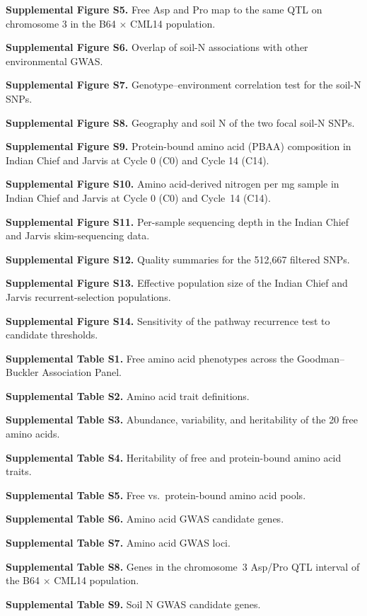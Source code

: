 \documentclass[namedate,unnumsec,webpdf,contemporary,large]{oup-authoring-template}
\begin{document}
\textbf{Supplemental Figure S5.} Free Asp and Pro map to the same QTL on chromosome 3 in the B64 $\times$ CML14 population.

\textbf{Supplemental Figure S6.} Overlap of soil-N associations with other environmental GWAS.

\textbf{Supplemental Figure S7.} Genotype--environment correlation test for the soil-N SNPs.

\textbf{Supplemental Figure S8.} Geography and soil N of the two focal soil-N SNPs.

\textbf{Supplemental Figure S9.} Protein-bound amino acid (PBAA) composition in Indian Chief and Jarvis at Cycle 0 (C0) and Cycle 14 (C14).

\textbf{Supplemental Figure S10.} Amino acid-derived nitrogen per mg sample in Indian Chief and Jarvis at Cycle 0 (C0) and Cycle~14 (C14).

\textbf{Supplemental Figure S11.} Per-sample sequencing depth in the Indian Chief and Jarvis skim-sequencing data.

\textbf{Supplemental Figure S12.} Quality summaries for the 512,667 filtered SNPs.

\textbf{Supplemental Figure S13.} Effective population size of the Indian Chief and Jarvis recurrent-selection populations.

\textbf{Supplemental Figure S14.} Sensitivity of the pathway recurrence test to candidate thresholds.

\textbf{Supplemental Table S1.} Free amino acid phenotypes across the Goodman--Buckler Association Panel.

\textbf{Supplemental Table S2.} Amino acid trait definitions.

\textbf{Supplemental Table S3.} Abundance, variability, and heritability of the 20 free amino acids.

\textbf{Supplemental Table S4.} Heritability of free and protein-bound amino acid traits.

\textbf{Supplemental Table S5.} Free vs.\ protein-bound amino acid pools.

\textbf{Supplemental Table S6.} Amino acid GWAS candidate genes.

\textbf{Supplemental Table S7.} Amino acid GWAS loci.

\textbf{Supplemental Table S8.} Genes in the chromosome~3 Asp/Pro QTL interval of the B64 $\times$ CML14 population.

\textbf{Supplemental Table S9.} Soil N GWAS candidate genes.
\end{document}
